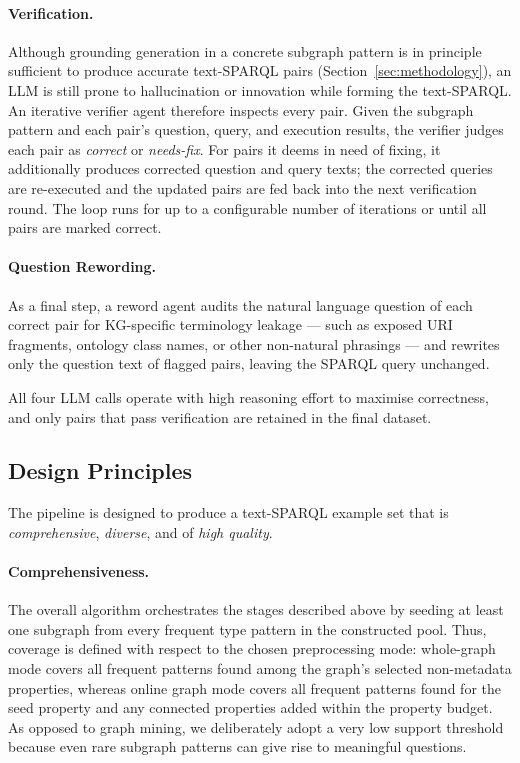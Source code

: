 \paragraph{Verification.}
Although grounding generation in a concrete subgraph pattern is in principle sufficient to produce accurate text-SPARQL pairs (Section~\ref{sec:methodology}), an LLM is still prone to hallucination or innovation while forming the text-SPARQL. An iterative verifier agent therefore inspects every pair. Given the subgraph pattern and each pair's question, query, and execution results, the verifier judges each pair as \textit{correct} or \textit{needs-fix}. For pairs it deems in need of fixing, it additionally produces corrected question and query texts; the corrected queries are re-executed and the updated pairs are fed back into the next verification round. The loop runs for up to a configurable number of iterations or until all pairs are marked correct.

\paragraph{Question Rewording.}
As a final step, a reword agent audits the natural language question of each correct pair for KG-specific terminology leakage — such as exposed URI fragments, ontology class names, or other non-natural phrasings — and rewrites only the question text of flagged pairs, leaving the SPARQL query unchanged.

All four LLM calls operate with high reasoning effort to maximise correctness, and only pairs that pass verification are retained in the final dataset.

\subsection{Design Principles}

The pipeline is designed to produce a text-SPARQL example set that is \textit{comprehensive}, \textit{diverse}, and of \textit{high quality}.

\paragraph{Comprehensiveness.} The overall algorithm orchestrates the stages described above by seeding at least one subgraph from every frequent type pattern in the constructed pool. Thus, coverage is defined with respect to the chosen preprocessing mode: whole-graph mode covers all frequent patterns found among the graph's selected non-metadata properties, whereas online graph mode covers all frequent patterns found for the seed property and any connected properties added within the property budget. As opposed to graph mining, we deliberately adopt a very low support threshold because even rare subgraph patterns can give rise to meaningful questions.


